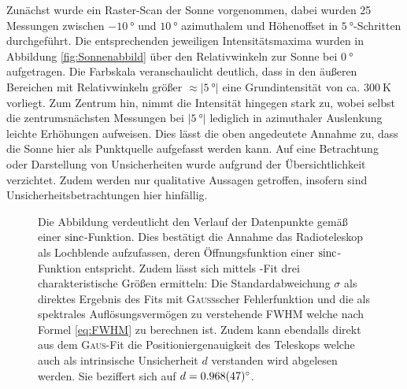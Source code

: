     Zunächst wurde ein Raster-Scan der Sonne vorgenommen, dabei wurden 25 Messungen zwischen $\SI{-10}{\degree}$ und $\SI{10}{\degree}$ azimuthalem und Höhenoffset in $\SI{5}{\degree}$-Schritten durchgeführt.
    Die entsprechenden jeweiligen Intensitätsmaxima wurden in Abbildung \ref{fig:Sonnenabbild} über den Relativwinkeln zur Sonne bei $\SI{0}{\degree}$ aufgetragen.
    Die Farbskala veranschaulicht deutlich, dass in den äußeren Bereichen mit Relativwinkeln größer $\approx \vert \SI{5}{\degree}\vert$ eine Grundintensität von ca. $\SI{300}{\kelvin}$ vorliegt.
    Zum Zentrum hin, nimmt die Intensität hingegen stark zu,
    wobei selbst die zentrumsnächsten Messungen bei $\vert\SI{5}{\degree}\vert$ lediglich in azimuthaler Auslenkung leichte Erhöhungen aufweisen.
    Dies lässt die oben angedeutete Annahme zu, dass die Sonne hier als Punktquelle aufgefasst werden kann.
    Auf eine Betrachtung oder Darstellung von Unsicherheiten wurde aufgrund der Übersichtlichkeit verzichtet. Zudem werden nur qualitative Aussagen getroffen, insofern sind Unsicherheitsbetrachtungen hier hinfällig.

    \begin{figure}[H]
        \centering
        
        \caption[Kreuz-Scan der Sonne, Azimuthaler Offset]{Die Abbildung verdeutlicht den Verlauf der Datenpunkte gemäß einer $\operatorname{sinc}$-Funktion. Dies bestätigt die Annahme das Radioteleskop als Lochblende aufzufassen, deren Öffnungsfunktion einer $\operatorname{sinc}$-Funktion entspricht. Zudem lässt sich mittels -Fit drei charakteristische Größen ermitteln: Die Standardabweichung $\sigma$ als direktes Ergebnis des Fits mit \textsc{Gauß}scher Fehlerfunktion und die als spektrales Auflösungsvermögen zu verstehende FWHM welche nach Formel \eqref{eq:FWHM} zu berechnen ist. Zudem kann ebendalls direkt aus dem \textsc{Gaus}-Fit die Positioniergenauigkeit des Teleskops welche auch als intrinsische Unsicherheit $d$ verstanden wird abgelesen werden. Sie beziffert sich auf $d = \SI{0.968 \pm 0.047}{\degree}$.}
        \label{fig:Sonnenkreuz_Az}
    \end{figure}

